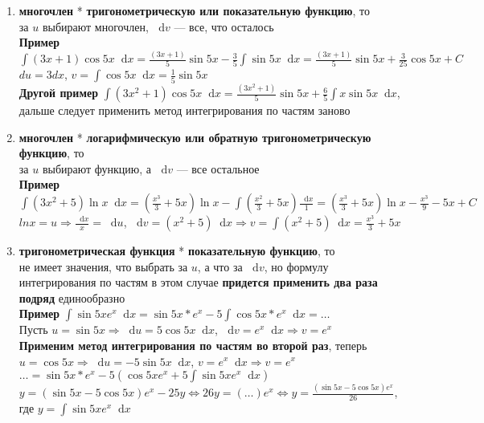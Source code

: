 \documentclass{article}
\newcommand*\diff{\mathop{}\!\mathrm{d}}
\begin{document}
\begin{enumerate}
    \item \textbf{многочлен} * \textbf{тригонометрическую или показательную функцию}, то \\
    за $u$ выбирают многочлен, $\diff v$ — все, что осталось \\
    \textbf{Пример} $\int (3 x + 1) \cos 5 x \diff x = \frac{(3x + 1)}{5} \sin 5 x - \frac{3}{5} \int \sin 5 x \diff x = \frac{(3 x + 1)}{5} \sin 5 x + \frac{3}{25} \cos 5 x + C$ \\
    $du = 3 d x$, $v = \int \cos 5 x \diff x = \frac{1}{5} \sin 5x$ \\
    \textbf{Другой пример} $\int (3 x^2 + 1) \cos 5 x \diff x = \frac{(3 x^2 + 1)}{5} \sin 5 x + \frac{6}{5} \int x \sin 5 x \diff x$, дальше следует применить метод интегрирования по частям заново
    \item \textbf{многочлен} * \textbf{логарифмическую или обратную тригонометрическую функцию}, то \\
    за $u$ выбирают функцию, а $\diff v$ — все остальное \\
    \textbf{Пример} $\int (3x^2 + 5) \ln x \diff x = (\frac{x^3}{3} + 5 x) \ln x - \int (\frac{x^2}{3} + 5 x) \frac{\diff x}{1} = (\frac{x^3}{3} + 5x) \ln x - \frac{x^3}{9} - 5 x + C$ \\
    $ln x = u \Longrightarrow \frac{\diff x}{x} = \diff u$, $\diff v = (x^2 + 5) \diff x \Longrightarrow v = \int (x^2 + 5) \diff x = \frac{x^3}{3} + 5 x$
    \item \textbf{тригонометрическая функция} * \textbf{показательную функцию}, то \\
    не имеет значения, что выбрать за $u$, а что за $\diff v$, но формулу интегрирования по частям в этом случае \textbf{придется применить два раза подряд} единообразно \\
    \textbf{Пример} $\int \sin 5x e^{x} \diff x = \sin 5 x * e^{x} - 5 \int \cos 5 x * e^{x} \diff x = \dots$ \\
    Пусть $u = \sin 5x \Longrightarrow \diff u = 5 \cos 5 x \diff x$, $\diff v = e^{x} \diff x \Longrightarrow v = e^{x}$ \\
    \textbf{Применим метод интегрирования по частям во второй раз}, теперь $u = \cos 5 x \Longrightarrow \diff u = - 5 \sin 5 x \diff x$, $v = e^{x} \diff x \Longrightarrow v = e^{x}$ \\
    $\dots = \sin 5 x * e^{x} - 5 (\cos 5 x e^{x} + 5 \int \sin 5 x e^{x} \diff x)$ \\
    $y = (\sin 5 x - 5 \cos 5 x) e^{x} - 25 y \Longleftrightarrow 26 y = (\dots) e^{x} \Longleftrightarrow y = \frac{(\sin 5x - 5 \cos 5 x) e^{x}}{26}$, где $y = \int \sin 5 x e^{x} \diff x$
\end{enumerate}
\end{document}
